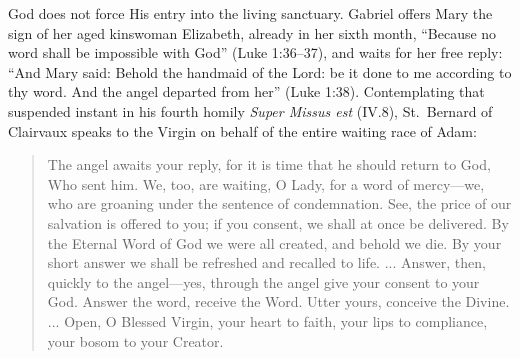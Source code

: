 God does not force His entry into the living sanctuary. Gabriel offers Mary the sign of her aged kinswoman Elizabeth, already in her sixth month, ``Because no word shall be impossible with God'' (Luke 1:36--37), and waits for her free reply: ``And Mary said: Behold the handmaid of the Lord: be it done to me according to thy word. And the angel departed from her'' (Luke 1:38). Contemplating that suspended instant in his fourth homily \textit{Super Missus est} (IV.8), St.\ Bernard of Clairvaux speaks to the Virgin on behalf of the entire waiting race of Adam:

\begin{quote}\small
The angel awaits your reply, for it is time that he should return to God, Who sent him. We, too, are waiting, O Lady, for a word of mercy---we, who are groaning under the sentence of condemnation. See, the price of our salvation is offered to you; if you consent, we shall at once be delivered. By the Eternal Word of God we were all created, and behold we die. By your short answer we shall be refreshed and recalled to life. ... Answer, then, quickly to the angel---yes, through the angel give your consent to your God. Answer the word, receive the Word. Utter yours, conceive the Divine. ... Open, O Blessed Virgin, your heart to faith, your lips to compliance, your bosom to your Creator.
\end{quote}

